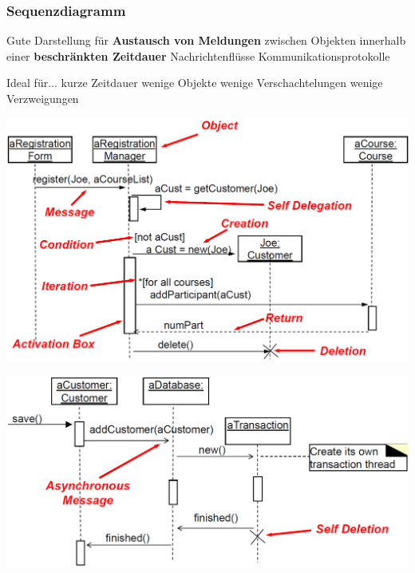 \subsubsection{Sequenzdiagramm}
\label{Sequenzdiagramm}

\begin{minipage}[t]{0.48\columnwidth}
    \begin{outline}
        \1 Gute Darstellung für \textbf{Austausch von Meldungen} zwischen Objekten innerhalb einer \textbf{beschränkten Zeitdauer}
            \2 Nachrichtenflüsse
            \2 Kommunikationsprotokolle
    \end{outline}
\end{minipage}
\hfill
\begin{minipage}[t]{0.48\columnwidth}
    \begin{outline}
        \1 Ideal für...
            \2 kurze Zeitdauer
            \2 wenige Objekte
            \2 wenige Verschachtelungen
            \2 wenige Verzweigungen
    \end{outline}
\end{minipage}


\begin{center}
    \includegraphics[width=0.8\columnwidth]{images/sequenzdiagramm_elemente_1.png}

    \vspace{0.3cm}

    \includegraphics[width=0.8\columnwidth]{images/sequenzdiagramm_elemente_2.png}
\end{center}



